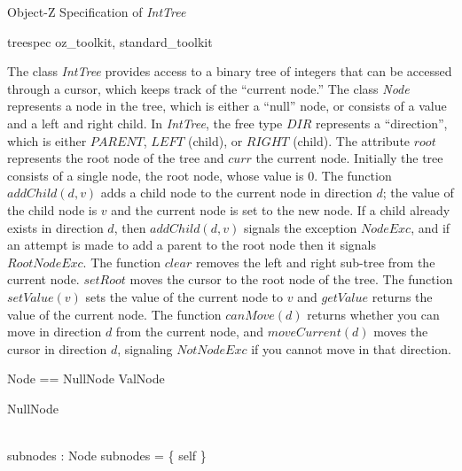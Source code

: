 \documentclass{article}
\begin{document}
\begin{center}
\begin{large}
Object-Z Specification of {\em IntTree}
\end{large}
\end{center}

\begin{zsection}
  \SECTION treespec \parents oz\_toolkit, standard\_toolkit
\end{zsection}

\noindent
The class {\em IntTree} provides access to a binary tree of integers that
can be accessed through a cursor, which keeps track of the ``current node.''
The class {\em Node} represents a node in the tree, which is either a
``null'' node, or consists of a value and a left and right child.
In {\em IntTree}, the free type $DIR$ represents a ``direction'', which
is either $PARENT$, $LEFT$ (child), or $RIGHT$ (child).
The attribute $root$ represents the root node of the tree
and $curr$ the current node.
Initially the tree consists of a single node, the root node, whose value
is 0.
The function $addChild(d,v)$ adds a child node to the current node in
direction $d$; the value of the child node is $v$ and the current node
is set to the new node.
If a child already exists in direction $d$, then $addChild(d,v)$ signals
the exception $NodeExc$, and if an attempt is made to add a parent to the
root node then it signals $RootNodeExc$.
The function $clear$ removes the left and right sub-tree from the current node.
$setRoot$ moves the cursor to the root node of the tree.
The function $setValue(v)$ sets the value of the current node to $v$ and
$getValue$ returns the value of the current node.
The function $canMove(d)$ returns whether you can move in direction $d$
from the current node, and $moveCurrent(d)$ moves the cursor in direction
$d$, signaling $NotNodeExc$ if you cannot move in that direction.

\begin{zed}
Node == NullNode \classuni ValNode
\end{zed}

\begin{class}{NullNode}
\begin{state}
	\Delta \\
	subnodes : \finset Node
\where
	subnodes = \{ self \}
\end{state}
\end{class}
\end{document}
